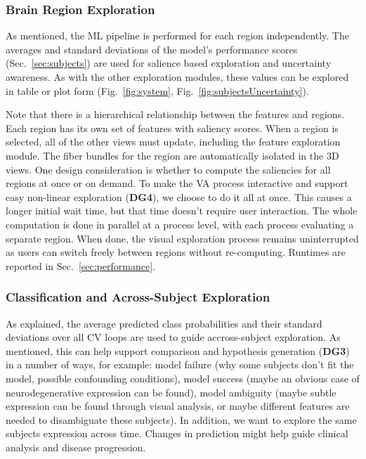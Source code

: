 
\subsubsection{Brain Region Exploration}
\label{sec:brainregionlevel}

\noindent As mentioned, the ML pipeline is performed for each region independently. The averages and standard deviations of the model's performance scores (Sec.~\ref{sec:subjects}) are used for salience based exploration and uncertainty awareness. As with the other exploration modules, these values can be explored in table or plot form (Fig.~\ref{fig:system}, Fig.~\ref{fig:subjectsUncertainty}).

Note that there is a hierarchical relationship between the features and regions. Each region has its own set of features with saliency scores. When a region is selected, all of the other views must update, including the feature exploration module. The fiber bundles for the region are automatically isolated in the 3D views. One design consideration is whether to compute the saliencies for all regions at once or on demand. To make the VA process interactive and support easy non-linear exploration (\textbf{DG4}), we choose to do it all at once. This causes a longer initial wait time, but that time doesn't require user interaction. The whole computation is done in parallel at a process level, with each process evaluating a separate region. When done, the visual exploration process remains uninterrupted as users can switch freely between regions without re-computing. Runtimes are reported in Sec.~\ref{sec:performance}.


\subsubsection{Classification and Across-Subject Exploration}
\label{sec:subjectlevel}

\noindent As explained, the average predicted class probabilities and their standard deviations over all CV loops are used to guide accross-subject exploration. As mentioned, this can help support comparison and hypothesis generation (\textbf{DG3}) in a number of ways, for example: model failure (why some subjects don't fit the model, possible confounding conditions), model success (maybe an obvious case of neurodegenerative expression can be found), model ambiguity (maybe subtle expression can be found through visual analysis, or maybe different features are needed to disambiguate these subjects). In addition, we want to explore the same subjects expression across time. Changes in prediction might help guide clinical analysis and disease progression. 

